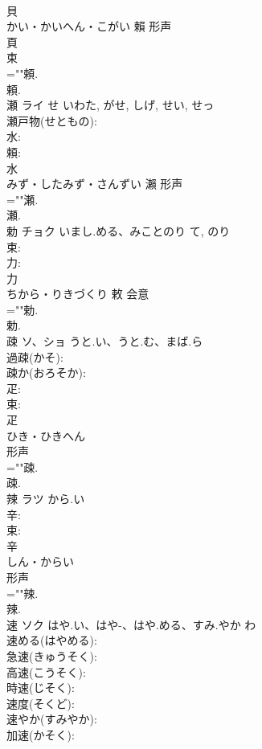\documentclass[8pt]{extreport}
\begin{document}
\begin{CJK}{UTF8}{min}
\\	貝	
\\	かい・かいへん・こがい	賴	形声 
\\	頁 
\\	束 
\\	=""頼.
\\	頼.
\\	瀬	ライ	せ	いわた, がせ, しげ, せい, せっ	
\\	瀬戸物(せともの): 
\\	水: 
\\	頼: 
\\	水	
\\	みず・したみず・さんずい	瀨	形声 
\\	=""瀬.
\\	瀬.
\\	勅	チョク	いまし.める、みことのり	て, のり	
\\	束: 
\\	力: 
\\	力	
\\	ちから・りきづくり	敕	会意 
\\	=""勅.
\\	勅.
\\	疎	ソ、ショ	うと.い、うと.む、まば.ら		
\\	過疎(かそ): 
\\	疎か(おろそか): 
\\	疋: 
\\	束: 
\\	疋	
\\	ひき・ひきへん	
\\	形声 
\\	=""疎.
\\	疎.
\\	辣	ラツ	から.い		
\\	辛: 
\\	束: 
\\	辛	
\\	しん・からい	
\\	形声 
\\	=""辣.
\\	辣.
\\	速	ソク	はや.い、はや-、はや.める、すみ.やか	わ	
\\	速める(はやめる): 
\\	急速(きゅうそく): 
\\	高速(こうそく): 
\\	時速(じそく): 
\\	速度(そくど): 
\\	速やか(すみやか): 
\\	加速(かそく): 

\end{CJK}
\end{document}
